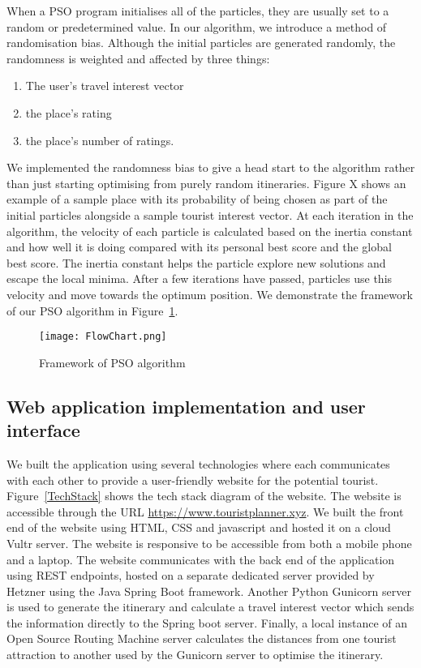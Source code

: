 When a PSO program initialises all of the particles,
they are usually set to a random or predetermined
value. In our algorithm, we introduce a method of
randomisation bias. Although the initial particles are
generated randomly, the randomness is weighted and
affected by three things: 
\begin{enumerate}
    
    \item The user's travel interest vector 
    \item the place's rating 
    \item the place's number of ratings.

\end{enumerate}
  We implemented the randomness bias to give a
head start to the algorithm rather than just starting
optimising from purely random itineraries. Figure X
shows an example of a sample place with its
probability of being chosen as part of the initial
particles alongside a sample tourist interest vector.
At each iteration in the algorithm, the velocity of
each particle is calculated based on the inertia
constant and how well it is doing compared with its
personal best score and the global best score. The
inertia constant helps the particle explore new
solutions and escape the local minima. After a few
iterations have passed, particles use this velocity
and move towards the optimum position. We demonstrate
the framework of our PSO algorithm in Figure~\ref{FlowChart}.

\begin{figure}[h]
\centering
\texttt{[image: FlowChart.png]}
\caption{Framework of PSO algorithm}
\label{FlowChart}
\end{figure}

\subsection{Web application implementation and user
interface}

We built the application using several technologies
where each communicates with each other to provide a
user-friendly website for the potential tourist.
Figure~\ref{TechStack} shows the tech stack diagram of the website.
The website is accessible through the URL
\url{https://www.touristplanner.xyz}. We built the front end of the website using HTML, CSS and javascript and hosted it
on a cloud Vultr server. The website is 
responsive to be accessible from both a
mobile phone and a laptop. The website communicates
with the back end of the application using REST
endpoints, hosted on a separate dedicated server
provided by Hetzner using the Java Spring Boot
framework.  Another Python Gunicorn server is used to
generate the itinerary and calculate a travel interest
vector which sends the information directly to the
Spring boot server. Finally, a local instance of an
Open Source Routing Machine server calculates the
distances from one tourist attraction to another used
by the Gunicorn server to optimise the itinerary. 

